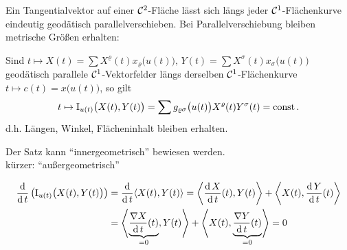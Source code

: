 \begin{folgerung}
 Ein Tangentialvektor auf einer \(\mathcal{C}^2\)-Fläche lässt sich längs jeder \(\mathcal{C}^1\)-Flächenkurve eindeutig geodätisch parallelverschieben. Bei Parallelverschiebung bleiben metrische Größen erhalten:
\end{folgerung}

\begin{satz}\label{satz221}
 Sind \(t \mapsto X(t) = \sum X^\varrho (t) x_\varrho\big(u(t)\big), \, Y(t) = \sum X^\sigma(t) x_\sigma \big(u(t)\big)\) geodätisch parallele \(\mathcal{C}^1\)-Vektorfelder längs derselben \(\mathcal{C}^1\)-Flächenkurve \(t \mapsto c(t) = x\big(u(t)\big)\), so gilt
 \begin{align*}
  t \mapsto \Rom 1_{u(t)}\big(X(t), Y(t)\big) = \sum g_{\varrho \sigma} \big(u(t)\big) X^\varrho(t) Y^\sigma(t) = \const.
 \end{align*}
d.h. Längen, Winkel, Flächeninhalt bleiben erhalten.
\end{satz}
Der Satz kann "`innergeometrisch"' bewiesen werden. \\
kürzer: "`außergeometrisch"'

\begin{beweis}
 \begin{align*}
  \frac{\dd}{\dd t} \left( \Rom 1_{u(t)} \big( X(t), Y(t) \big)\right) &= \frac{\dd}{\dd t} \langle X(t), Y(t)\rangle = \left\langle \frac{\dd X}{\dd t}(t), Y(t) \right\rangle + \left\langle X(t), \frac{\dd Y}{\dd t}(t)\right\rangle \\
  &= \left\langle \underbrace{\frac{\nabla X}{\dd t} (t)}_{=0}, Y(t) \right\rangle + \left\langle X(t), \underbrace{\frac{\nabla Y}{\dd t}(t)}_{=0} \right\rangle =0
 \end{align*}

\end{beweis}

